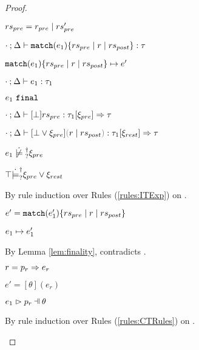 \begin{proof}
\begin{byCases}
  \resetpfcounter
\item[\text{(\ref{rule:TMatchNZPre})}]
  \begin{pfsteps*}
  \item $rs_{pre} = r_{pre} \mid rs_{pre}'$ 
  \item $\cdot \mathbin{;} \Delta \vdash \mathtt{match}(e_1) \{rs_{pre} \mid r \mid rs_{post}\} : \tau$  
  \item $\mathtt{match}(e_1) \{rs_{pre} \mid r \mid rs_{post}\} \mapsto e'$  
  \item $\cdot \mathbin{;} \Delta \vdash e_1 : \tau_1$  
  \item $e_1 ~\mathtt{final}$  
  \item $\cdot \mathbin{;} \Delta \vdash [\bot] rs_{pre} : \tau_1 [\xi_{pre}] \Rightarrow \tau$  
  \item $\chrulstyp{\cdot}{\Delta}{\cor{\cfalsity}{\xi_{pre}}}{\hrulesP{r}{rs_{post}}}{\tau_1}{\xi_{rest}}{\tau}$  
  \item $\cnotsatisfyormay{e_1}{\xi_{pre}}$  
  \item $\top \dot{\models}_{?}^{\dag} \xi_{pre} \vee \xi_{rest}$  
  \end{pfsteps*}
  By rule induction over Rules (\ref{rules:ITExp}) on .
  \begin{byCases}

  \item[\text{(\ref{rule:ITExpMatch})}]
    \begin{pfsteps*}
    \item $e' = \mathtt{match}(e_1') \{rs_{pre} \mid r \mid rs_{post}\}$ 
    \item $e_1 \mapsto e_1'$  
    \end{pfsteps*}
    By Lemma \ref{lem:finality},   contradicts .
  
  \item[\text{(\ref{rule:ITSuccMatch})}]
    \begin{pfsteps*}
    \item $r = p_r \Rightarrow e_r$ 
    \item $e' = [\theta](e_r)$ 
    \item $\hpatmatch{e_1}{p_r}{\theta}$  
    \end{pfsteps*}
    By rule induction over Rules (\ref{rules:CTRules}) on .
    \begin{byCases}


\end{byCases}
\end{byCases}
\end{byCases}
\end{proof}
